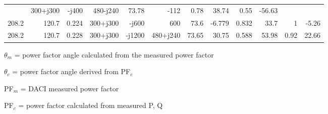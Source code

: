 \begin{table}[H]
\begin{threeparttable}
\begin{tabular}{*{12}{r}}
      & 300+j300                        & -j400
      & 480-j240                         & 73.78            & -112
      & 0.78            & 38.74                            & 0.55
      & -56.63                           \\
      208.2                 & 120.7                 & 0.224
      & 300+j300                        & -j600
      & 600                              & 73.6             & -6.779
      & 0.832           & 33.7                             & 1
      & -5.26                            \\
      208.2                 & 120.7                 & 0.228
      & 300+j300                        & -j1200
      & 480+j240                         & 73.65            & 30.75
      & 0.588           & 53.98                            & 0.92
      & 22.66                            \\
      \bottomrule
    \end{tabular}
    \begin{tablenotes}\footnotesize
    \item $\theta_{m}$ = power factor angle calculated from the
      measured power factor
    \item $\theta_{c}$ = power factor angle derived from PF$_{c}$
    \item PF$_{m}$ = DACI measured power factor
    \item PF$_{c}$ = power factor calculated from measured P, Q
    \end{tablenotes}
  \end{threeparttable}
\end{table}
